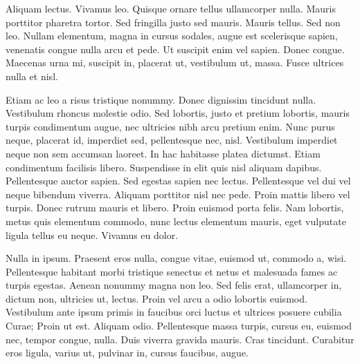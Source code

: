 \documentclass[AMS,STIX2COL]{WileyNJD-v2}
\begin{document}
    Aliquam lectus. Vivamus leo. Quisque ornare tellus ullamcorper nulla. Mauris porttitor pharetra tortor. Sed fringilla
    justo sed mauris. Mauris tellus. Sed non leo. Nullam elementum, magna in cursus sodales, augue est scelerisque
    sapien, venenatis congue nulla arcu et pede. Ut suscipit enim vel sapien. Donec congue. Maecenas urna mi, suscipit
    in, placerat ut, vestibulum ut, massa. Fusce ultrices nulla et nisl.

    Etiam ac leo a risus tristique nonummy. Donec dignissim tincidunt nulla. Vestibulum rhoncus molestie odio. Sed
    lobortis, justo et pretium lobortis, mauris turpis condimentum augue, nec ultricies nibh arcu pretium enim. Nunc
    purus neque, placerat id, imperdiet sed, pellentesque nec, nisl. Vestibulum imperdiet neque non sem accumsan laoreet.
    In hac habitasse platea dictumst. Etiam condimentum facilisis libero. Suspendisse in elit quis nisl aliquam dapibus.
    Pellentesque auctor sapien. Sed egestas sapien nec lectus. Pellentesque vel dui vel neque bibendum viverra. Aliquam
    porttitor nisl nec pede. Proin mattis libero vel turpis. Donec rutrum mauris et libero. Proin euismod porta felis.
    Nam lobortis, metus quis elementum commodo, nunc lectus elementum mauris, eget vulputate ligula tellus eu neque.
    Vivamus eu dolor.

    Nulla in ipsum. Praesent eros nulla, congue vitae, euismod ut, commodo a, wisi. Pellentesque habitant morbi
    tristique senectus et netus et malesuada fames ac turpis egestas. Aenean nonummy magna non leo. Sed felis erat,
    ullamcorper in, dictum non, ultricies ut, lectus. Proin vel arcu a odio lobortis euismod. Vestibulum ante ipsum primis
    in faucibus orci luctus et ultrices posuere cubilia Curae; Proin ut est. Aliquam odio. Pellentesque massa turpis, cursus
    eu, euismod nec, tempor congue, nulla. Duis viverra gravida mauris. Cras tincidunt. Curabitur eros ligula, varius ut,
    pulvinar in, cursus faucibus, augue.
\end{document}
